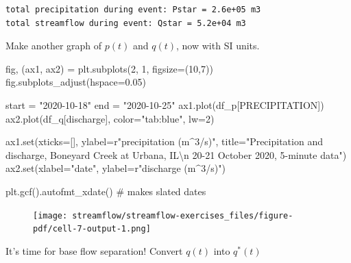 \documentclass[
  letterpaper,
  DIV=11,
  numbers=noendperiod]{scrreprt}
\newenvironment{Shaded}{\begin{snugshade}}{\end{snugshade}}
\newcommand{\BuiltInTok}[1]{\textcolor[rgb]{0.00,0.23,0.31}{#1}}
\newcommand{\CharTok}[1]{\textcolor[rgb]{0.13,0.47,0.30}{#1}}
\newcommand{\CommentTok}[1]{\textcolor[rgb]{0.37,0.37,0.37}{#1}}
\newcommand{\DecValTok}[1]{\textcolor[rgb]{0.68,0.00,0.00}{#1}}
\newcommand{\FloatTok}[1]{\textcolor[rgb]{0.68,0.00,0.00}{#1}}
\newcommand{\NormalTok}[1]{\textcolor[rgb]{0.00,0.23,0.31}{#1}}
\newcommand{\OperatorTok}[1]{\textcolor[rgb]{0.37,0.37,0.37}{#1}}
\newcommand{\StringTok}[1]{\textcolor[rgb]{0.13,0.47,0.30}{#1}}
\newcommand{\VerbatimStringTok}[1]{\textcolor[rgb]{0.13,0.47,0.30}{#1}}
\begin{document}
\begin{verbatim}
total precipitation during event: Pstar = 2.6e+05 m3
total streamflow during event: Qstar = 5.2e+04 m3
\end{verbatim}

Make another graph of \(p(t)\) and \(q(t)\), now with SI units.

\begin{Shaded}
\begin{Highlighting}[]
\NormalTok{fig, (ax1, ax2) }\OperatorTok{=}\NormalTok{ plt.subplots(}\DecValTok{2}\NormalTok{, }\DecValTok{1}\NormalTok{, figsize}\OperatorTok{=}\NormalTok{(}\DecValTok{10}\NormalTok{,}\DecValTok{7}\NormalTok{))}
\NormalTok{fig.subplots\_adjust(hspace}\OperatorTok{=}\FloatTok{0.05}\NormalTok{)}

\NormalTok{start }\OperatorTok{=} \StringTok{"2020{-}10{-}18"}
\NormalTok{end }\OperatorTok{=} \StringTok{"2020{-}10{-}25"}
\NormalTok{ax1.plot(df\_p[}\StringTok{\textquotesingle{}PRECIPITATION\textquotesingle{}}\NormalTok{])}
\NormalTok{ax2.plot(df\_q[}\StringTok{\textquotesingle{}discharge\textquotesingle{}}\NormalTok{], color}\OperatorTok{=}\StringTok{"tab:blue"}\NormalTok{, lw}\OperatorTok{=}\DecValTok{2}\NormalTok{)}

\NormalTok{ax1.}\BuiltInTok{set}\NormalTok{(xticks}\OperatorTok{=}\NormalTok{[],}
\NormalTok{        ylabel}\OperatorTok{=}\VerbatimStringTok{r"precipitation (m$\^{}3$/s)"}\NormalTok{,}
\NormalTok{        title}\OperatorTok{=}\StringTok{"Precipitation and discharge, Boneyard Creek at Urbana, IL}\CharTok{\textbackslash{}n}\StringTok{ 20{-}21 October 2020, 5{-}minute data"}\NormalTok{)}
\NormalTok{ax2.}\BuiltInTok{set}\NormalTok{(xlabel}\OperatorTok{=}\StringTok{"date"}\NormalTok{,}
\NormalTok{        ylabel}\OperatorTok{=}\VerbatimStringTok{r"discharge (m$\^{}3$/s)"}\NormalTok{)}

\NormalTok{plt.gcf().autofmt\_xdate()  }\CommentTok{\# makes slated dates}
\end{Highlighting}
\end{Shaded}

\begin{figure}[H]

{\centering \texttt{[image: streamflow/streamflow-exercises\_files/figure-pdf/cell-7-output-1.png]}

}

\end{figure}

It's time for base flow separation! Convert \(q(t)\) into \(q^*(t)\)
\end{document}
